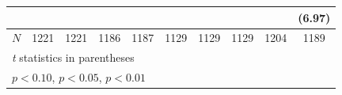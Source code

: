 \begin{table}[htbp]
\begin{tabular}{l*{9}{c}}
            &                     &                     &                     &                     &                     &                     &                     &                     &      (6.97)         \\
\hline
\(N\)       &        1221         &        1221         &        1186         &        1187         &        1129         &        1129         &        1129         &        1204         &        1189         \\
\hline\hline
\multicolumn{10}{l}{\footnotesize \textit{t} statistics in parentheses}\\
\multicolumn{10}{l}{\footnotesize \sym{*} \(p<0.10\), \sym{**} \(p<0.05\), \sym{***} \(p<0.01\)}\\
\end{tabular}
\end{table}
